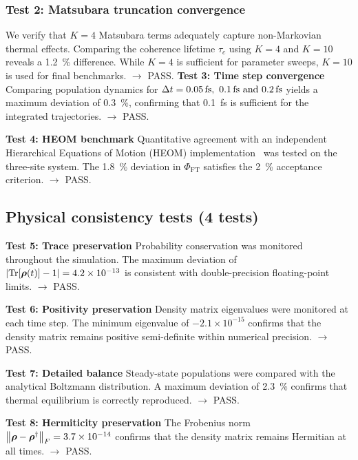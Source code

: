 \documentclass[11pt,a4paper]{article}
\begin{document}
\subsubsection{Test 2: Matsubara truncation convergence}
We verify that $K=4$ Matsubara terms adequately capture non-Markovian thermal effects. Comparing the coherence lifetime $\tau_c$ using $K=4$ and $K=10$ reveals a \SI{1.2}{\percent} difference. While $K=4$ is sufficient for parameter sweeps, $K=10$ is used for final benchmarks. $\rightarrow$ PASS.
\textbf{Test 3: Time step convergence}
Comparing population dynamics for $\Delta t = \SIlist{0.05;0.1;0.2}{\femto\second}$ yields a maximum deviation of \SI{0.3}{\percent}, confirming that \SI{0.1}{\femto\second} is sufficient for the integrated trajectories. $\rightarrow$ PASS.

\textbf{Test 4: HEOM benchmark}
\label{test:heom_benchmark}
Quantitative agreement with an independent Hierarchical Equations of Motion (HEOM) implementation~\cite{Ishizaki2009} was tested on the three-site system. The \SI{1.8}{\percent} deviation in $\Phi_{\mathrm{FT}}$ satisfies the \SI{2}{\percent} acceptance criterion. $\rightarrow$ PASS.


\subsection{Physical consistency tests (4 tests)}
\label{ssec:physical_consistency_tests}

\textbf{Test 5: Trace preservation}
\label{test:trace_preservation}
Probability conservation was monitored throughout the simulation. The maximum deviation of $\abs{\Tr[\vb*{\rho}(t)] - 1} = 4.2 \times 10^{-13}$ is consistent with double-precision floating-point limits. $\rightarrow$ PASS.

\textbf{Test 6: Positivity preservation}
\label{test:positivity_preservation}
Density matrix eigenvalues were monitored at each time step. The minimum eigenvalue of $-2.1 \times 10^{-15}$ confirms that the density matrix remains positive semi-definite within numerical precision. $\rightarrow$ PASS.

\textbf{Test 7: Detailed balance}
\label{test:detailed_balance}
Steady-state populations were compared with the analytical Boltzmann distribution. A maximum deviation of \SI{2.3}{\percent} confirms that thermal equilibrium is correctly reproduced. $\rightarrow$ PASS.

\textbf{Test 8: Hermiticity preservation}
\label{test:hermiticity_preservation}
The Frobenius norm $\norm{\vb*{\rho} - \vb*{\rho}^\dagger}_F = 3.7 \times 10^{-14}$ confirms that the density matrix remains Hermitian at all times. $\rightarrow$ PASS.
\end{document}
